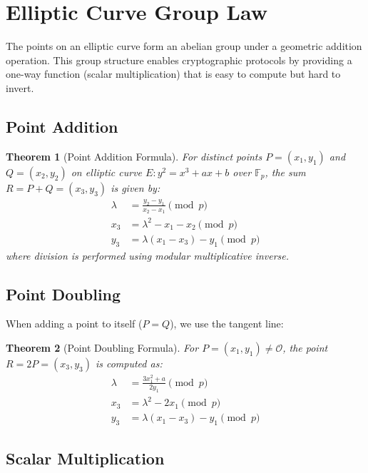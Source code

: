 \documentclass[a4paper, 11pt]{article}
\newtheorem{theorem}{Theorem}[section]
\begin{document}
\section{Elliptic Curve Group Law}

The points on an elliptic curve form an abelian group under a geometric addition operation. This group structure enables cryptographic protocols by providing a one-way function (scalar multiplication) that is easy to compute but hard to invert.

\subsection{Point Addition}

\begin{theorem}[Point Addition Formula]
For distinct points $P = (x_1, y_1)$ and $Q = (x_2, y_2)$ on elliptic curve $E: y^2 = x^3 + ax + b$ over $\mathbb{F}_p$, the sum $R = P + Q = (x_3, y_3)$ is given by:
\begin{align}
\lambda &= \frac{y_2 - y_1}{x_2 - x_1} \pmod{p} \\
x_3 &= \lambda^2 - x_1 - x_2 \pmod{p} \\
y_3 &= \lambda(x_1 - x_3) - y_1 \pmod{p}
\end{align}
where division is performed using modular multiplicative inverse.
\end{theorem}

\subsection{Point Doubling}

When adding a point to itself ($P = Q$), we use the tangent line:

\begin{theorem}[Point Doubling Formula]
For $P = (x_1, y_1) \neq \mathcal{O}$, the point $R = 2P = (x_3, y_3)$ is computed as:
\begin{align}
\lambda &= \frac{3x_1^2 + a}{2y_1} \pmod{p} \\
x_3 &= \lambda^2 - 2x_1 \pmod{p} \\
y_3 &= \lambda(x_1 - x_3) - y_1 \pmod{p}
\end{align}
\end{theorem}

\subsection{Scalar Multiplication}
\end{document}
